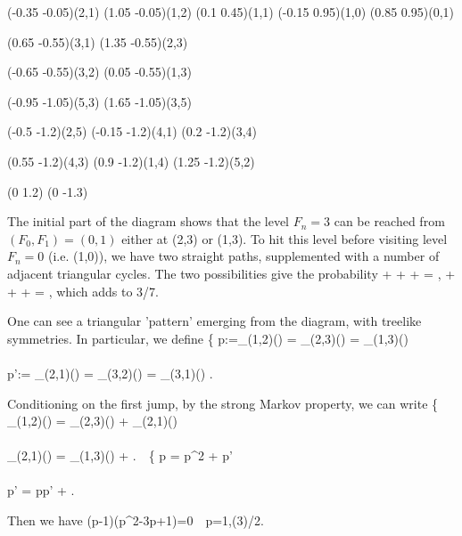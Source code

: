 {    \htext (-0.35 -0.05){(2,1)}
    \htext (1.05 -0.05){(1,2)}
    \htext (0.1 0.45){(1,1)}
    \htext (-0.15 0.95){(1,0)}
    \htext (0.85 0.95){(0,1)}

    \htext (0.65 -0.55){(3,1)}
    \htext (1.35 -0.55){(2,3)}

    \htext (-0.65 -0.55){(3,2)}
    \htext (0.05 -0.55){(1,3)}

    \htext (-0.95 -1.05){(5,3)}
    \htext (1.65 -1.05){(3,5)}

    \htext (-0.5 -1.2){(2,5)}
    \htext (-0.15 -1.2){(4,1)}
    \htext (0.2 -1.2){(3,4)}

    \htext (0.55 -1.2){(4,3)}
    \htext (0.9 -1.2){(1,4)}
    \htext (1.25 -1.2){(5,2)}

\move (0 1.2)
\move (0 -1.3)
}

The initial part of the diagram shows that the level $F_n=3$ can be reached from $(F_0,F_1)=(0,1)$ either at (2,3) or (1,3). To hit this level before visiting level $F_n=0$ (i.e. (1,0)), we have two straight paths, supplemented with a number of adjacent triangular cycles. The two possibilities give the probability
\cdot {} \cdot {} +  +  + \cdots\rob = ,\cdot {} \cdot {} \cdot {} +  +  + \cdots\rob = ,
\ee
which adds to 3/7.

One can see a triangular 'pattern' emerging from the diagram, with treelike symmetries. In particular, we define
\be
\left\{
p:=\pro_{(1,2)}() = \pro_{(2,3)}() = \pro_{(1,3)}()\\
\\
p':=  \pro_{(2,1)}() = \pro_{(3,2)}() = \pro_{(3,1)}()
\ea\right.
\ee

Conditioning on the first jump, by the strong Markov property, we can write
\be
\left\{
\pro_{(1,2)}() =  \pro_{(2,3)}() +  \pro_{(2,1)}() \\
\\
\pro_{(2,1)}() =  \pro_{(1,3)}() + 
\ea\right.\ \ra \
\left\{
p =  p^2 +  p'\\
\\
p' =  pp' + 
\ea\right.
\ee

Then we have
\be
(p-1)(p^2-3p+1)=0\ \ra \ p=1,(3\pm{})/2.
\ee

